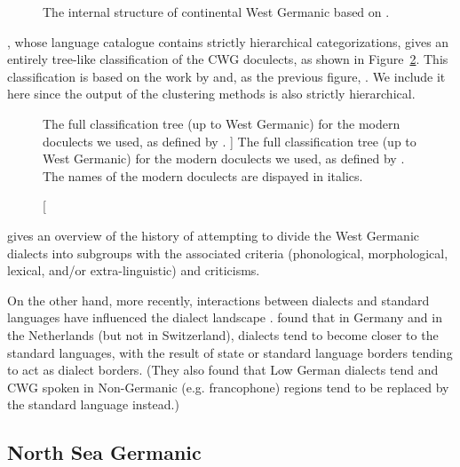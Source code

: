 \documentclass[a4paper]{article}
\begin{document}
\begin{figure}[b]
\centering

\caption{
The internal structure of continental West Germanic
based on \citet[p. 8]{harbert2007germanic}.
}
\label{fig:cwg_harbert}
\end{figure}


\citet{hammarstroem2018glottolog}, whose language catalogue
contains strictly hierarchical categorizations, %
gives an entirely tree-like classification of the CWG doculects,
as shown in Figure~\ref{fig:glottolog}.
This classification is based on the work by \citet{stiles2013pan-west}
and, as the previous figure, \citet{harbert2007germanic}.
We include it here since the output of the clustering methods
is also strictly hierarchical.

\begin{figure}[h]
\begin{adjustwidth}{-3cm}{-3cm}
\centering
\scalebox{0.8}{

}
\end{adjustwidth}
% 
\caption
[
The full classification tree (up to West Germanic) for the modern doculects we used,
as defined by \citet{hammarstroem2018glottolog}.
]
{
The full classification tree (up to West Germanic) for the modern doculects we used,
as defined by \citet{hammarstroem2018glottolog}.
The names of the modern doculects are dispayed in italics.
}
\label{fig:glottolog}
\end{figure}

\citet[pp. 72-80]{nielsen1989germanic} gives an overview of the history of attempting to divide the West Germanic dialects into subgroups with the associated criteria (phonological, morphological, lexical, and/or extra-linguistic) and criticisms.

On the other hand, more recently, %
interactions between dialects and standard languages
have influenced the dialect landscape
\citep{coetsem1992interaction}.
\citet{kremer1990einfuehrung} found that in Germany and in the Netherlands
(but not in Switzerland), dialects tend to become closer to the standard languages,
with the result of state or standard language borders tending to act as dialect borders.
(They also found that Low German dialects tend and CWG spoken in Non-Germanic (e.g. francophone) regions tend to be replaced by the standard language instead.)

\subsection{North Sea Germanic}
\end{document}
